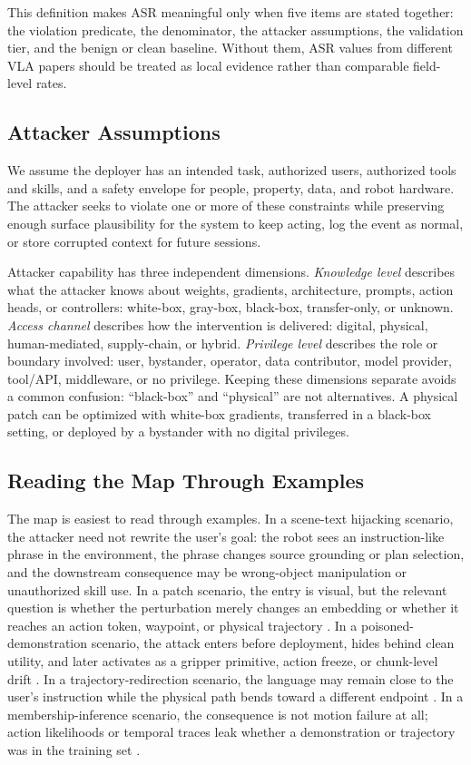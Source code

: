 This definition makes ASR meaningful only when five items are stated together: the violation predicate, the denominator, the attacker assumptions, the validation tier, and the benign or clean baseline. Without them, ASR values from different VLA papers should be treated as local evidence rather than comparable field-level rates.

\subsection{Attacker Assumptions}

We assume the deployer has an intended task, authorized users, authorized tools and skills, and a safety envelope for people, property, data, and robot hardware. The attacker seeks to violate one or more of these constraints while preserving enough surface plausibility for the system to keep acting, log the event as normal, or store corrupted context for future sessions.

Attacker capability has three independent dimensions. \emph{Knowledge level} describes what the attacker knows about weights, gradients, architecture, prompts, action heads, or controllers: white-box, gray-box, black-box, transfer-only, or unknown. \emph{Access channel} describes how the intervention is delivered: digital, physical, human-mediated, supply-chain, or hybrid. \emph{Privilege level} describes the role or boundary involved: user, bystander, operator, data contributor, model provider, tool/API, middleware, or no privilege. Keeping these dimensions separate avoids a common confusion: ``black-box'' and ``physical'' are not alternatives. A physical patch can be optimized with white-box gradients, transferred in a black-box setting, or deployed by a bystander with no digital privileges.

\subsection{Reading the Map Through Examples}

The map is easiest to read through examples. In a scene-text hijacking scenario, the attacker need not rewrite the user's goal: the robot sees an instruction-like phrase in the environment, the phrase changes source grounding or plan selection, and the downstream consequence may be wrong-object manipulation or unauthorized skill use. In a patch scenario, the entry is visual, but the relevant question is whether the perturbation merely changes an embedding or whether it reaches an action token, waypoint, or physical trajectory \cite{wang2025vlaadversarial,xu2025edpa,lu2026patch}. In a poisoned-demonstration scenario, the attack enters before deployment, hides behind clean utility, and later activates as a gripper primitive, action freeze, or chunk-level drift \cite{wang2025freezevla,xu2025dropvla,xu2026silentdrift}. In a trajectory-redirection scenario, the language may remain close to the user's instruction while the physical path bends toward a different endpoint \cite{puthumanaillam2026trajectory}. In a membership-inference scenario, the consequence is not motion failure at all; action likelihoods or temporal traces leak whether a demonstration or trajectory was in the training set \cite{peng2026miavla,luan2026vlaleaks}.

